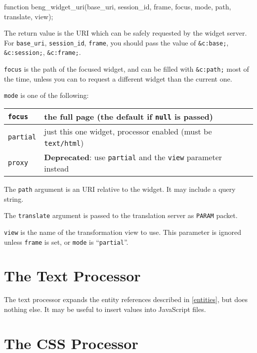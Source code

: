 \documentclass[a4paper,12pt]{article}
\begin{document}
\begin{verbatim*}
function
beng_widget_uri(base_uri, session_id, frame, focus, mode,
                path, translate, view);
\end{verbatim*}

The return value is the URI which can be safely requested by the
widget server.  For \texttt{base\_uri}, \texttt{session\_id},
\texttt{frame}, you should pass the value of \texttt{\&c:base;},
\texttt{\&c:session;}, \texttt{\&c:frame;}.

\texttt{focus} is the path of the focused widget, and can be filled
with \texttt{\&c:path;} most of the time, unless you can to request a
different widget than the current one.

\texttt{mode} is one of the following:

\begin{longtable}{|l|p{11cm}|}
\hline

\texttt{focus} & the full page (the default if \texttt{null} is
passed) \\

\hline

\texttt{partial} & just this one widget, processor enabled (must be
\texttt{text/html}) \\

\hline
\texttt{proxy} &
\textbf{Deprecated}: use \texttt{partial} and the \texttt{view}
parameter instead \\
\hline
\end{longtable}

The \texttt{path} argument is an URI relative to the widget.  It may
include a query string.

The \texttt{translate} argument is passed to the translation server as
\texttt{PARAM} packet.

\texttt{view} is the name of the transformation view to use.  This
parameter is ignored unless \texttt{frame} is set, or \texttt{mode} is
``\texttt{partial}''.


\section{The Text Processor}
\label{textprocessor}

The text processor expands the entity references described in
\ref{entities}, but does nothing else.  It may be useful to insert
values into JavaScript files.


\section{The CSS Processor}
\label{cssprocessor}
\end{document}

